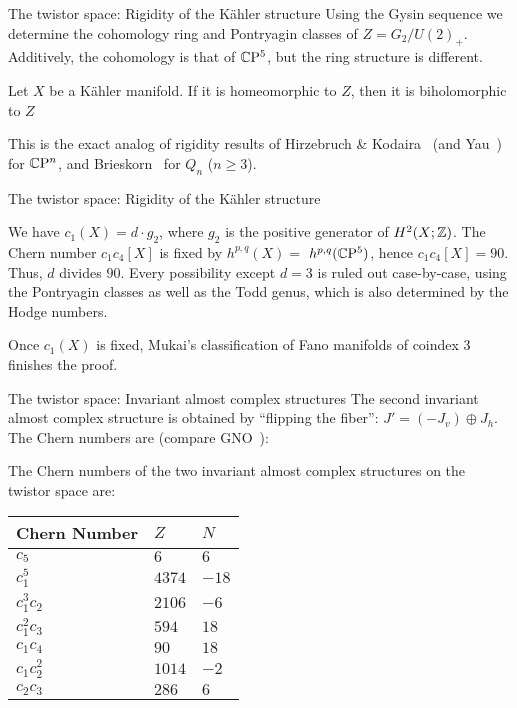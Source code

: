 \documentclass[11pt,parskip]{beamer}
\begin{document}
\begin{frame}{The twistor space: Rigidity of the K\"ahler structure}
	Using the Gysin sequence we determine the cohomology ring and Pontrya\-gin classes of $Z=G_2/U(2)_+$. Additively, the cohomology is that of $\mathbb{C}\mathrm{P}^5$, but the ring structure is different.\pause
	
	\bigskip 
	
	\begin{thm}
		Let $X$ be a K\"ahler manifold. If it is homeomorphic to $Z$, then it is biholomorphic to $Z$
	\end{thm}\pause
	
	\bigskip
	
	This is the exact analog of rigidity results of Hirzebruch \& Kodaira~\cite{HK1957} (and Yau~\cite{Yau1977}) for $\mathbb{C}\mathrm{P}^n$, and Brieskorn~\cite{Bri1964} for $Q_n$ ($n\geq 3$).
\end{frame}



\begin{frame}{The twistor space: Rigidity of the K\"ahler structure}
	\begin{myproof}
		We have $c_1(X)=d\cdot g_2$, where $g_2$ is the positive generator of $H^2(X;\mathbb{Z})$. The Chern number $c_1c_4[X]$ is fixed by $h^{p,q}(X)=$ $h^{p,q}(\mathbb{C}\mathrm{P}^5)$, hence $c_1c_4[X]=90$. Thus, $d$ divides $90$. Every possibility except $d=3$ is ruled out case-by-case, using the Pontryagin classes as well as the Todd genus, which is also determined by the Hodge numbers.\pause
	
		\bigskip
		
		Once $c_1(X)$ is fixed, Mukai's classification of Fano manifolds of coindex $3$ finishes the proof.	
	\end{myproof}
\end{frame}

\begin{frame}{The twistor space: Invariant almost complex structures}
	\pause
	The second invariant almost complex structure is obtained by ``flipping the fiber'': $J'=(-J_v)\oplus J_h$. The Chern numbers are (compare GNO~\cite{GNO2017}):\pause
	\begin{prop}
		The Chern numbers of the two invariant almost complex structures on the twistor space are:\vspace{-0.5cm}
		\begin{table}[ht!]\centering
			\begin{tabular}{lll} \toprule
				Chern Number& $Z$		& $N$ \\ \midrule
				$c_5$ 		& $6$		& $6$ \\
				$c_1^5$ 	& $4374$	& $-18$\\
				$c_1^3c_2$	& $2106$	& $-6$\\
				$c_1^2c_3$	& $594$		& $18$\\
				$c_1c_4$	& $90$		& $18$\\
				$c_1c_2^2$	& $1014$	& $-2$\\
				$c_2c_3$	& $286$		& $6$\\ \bottomrule
			\end{tabular}
		\end{table}
	\end{prop}
\end{frame}
\end{document}
